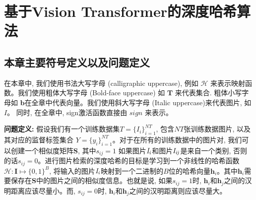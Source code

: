 \section{基于Vision Transformer的深度哈希算法}
\subsection{本章主要符号定义以及问题定义}
在本章中, 我们使用书法大写字母 (calligraphic uppercase), 例如 $\mathcal{H}$ 来表示映射函数。我们使用粗体大写字母 (Bold-face uppercase) 如 $\mathbf{T}$ 来代表集合. 粗体小写字母如 $\mathbf{b}$在全章中代表向量。我们使用斜大写字母 (Italic uppercase)来代表图片, 如 $\textit{I}$。 同时, 在全章中, sign激活函数直接由 $\textit{sign}$ 来表示。\par
\textbf{问题定义:} 假设我们有一个训练数据集$T = \{I_i\}_{i=1}^{NT}$, 包含$NT$张训练数据图片, 以及其对应的监督标签集合 $Y = \{y_i\}_{i=1}^{NT}$。对于在所有的训练数据中的图片对, 我们可以创建一个相似度矩阵$\mathbf{S}$, 其中$s_{ij} = 1$ 如果图片$\it{I}_i$和图片$\it{I}_{ij}$是来自一个类别, 否则的话$s_{ij} = 0$。进行图片检索的深度哈希的目标是学习到一个非线性的哈希函数$\mathcal{H}: \mathbf{I} \mapsto \{0,1\}^B $, 将输入的图片$\it{I}_i$映射到一个二进制的$B$位的哈希向量$\mathbf{h}_i$。其中$\mathbf{h}_i$需要保存在$\mathbf{S}$中的图片之间的相似度信息。也就是说, 如果$s_{ij} = 1$时, $\mathbf{h}_i$和$\mathbf{h}_j$之间的汉明距离应该尽量小。而, $s_{ij} = 0$时, $\mathbf{h}_i$和$\mathbf{h}_j$之间的汉明距离则应该尽量大。

